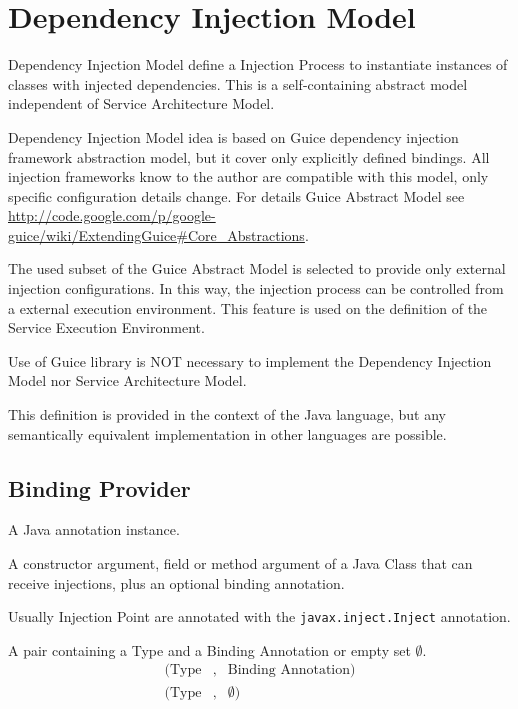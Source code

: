 \section{Dependency Injection Model}
\label{sec:ioc}

Dependency Injection Model define a Injection Process to instantiate instances of classes with injected dependencies. This is a self-containing abstract model independent of Service Architecture Model.

Dependency Injection Model idea is based on Guice dependency injection framework abstraction model, but it cover only explicitly defined bindings. All injection frameworks know to the author are compatible with this model, only specific configuration details change. For details Guice Abstract Model see \url{http://code.google.com/p/google-guice/wiki/ExtendingGuice#Core_Abstractions}.

The used subset of the Guice Abstract Model is selected to provide only external injection configurations. In this way, the injection process can be controlled from a external execution environment. This feature is used on the definition of the Service Execution Environment.

Use of Guice library is NOT necessary to implement the Dependency Injection Model nor Service Architecture Model.

This definition is provided in the context of the Java language, but any semantically equivalent implementation in other languages are possible.

\subsection{Binding Provider}

\begin{defi}
  A Java annotation instance.
\end{defi}

\begin{defi}
  A constructor argument, field or method argument of a Java Class that can receive injections, plus an optional binding annotation.
\end{defi}

Usually Injection Point are annotated with the \lstinline|javax.inject.Inject| annotation.

\begin{defi}[Key]
  A pair containing a Type and a Binding Annotation or empty set $\emptyset$.
\begin{eqnarray}
(\text{Type}&,&\text{Binding Annotation}) \nonumber \\
(\text{Type}&,&\emptyset) \nonumber 
\end{eqnarray}
\end{defi}

